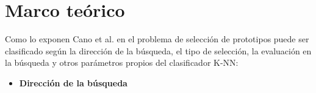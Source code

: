 \chapter{Marco teórico}
\label{capitulo1}

Como lo exponen Cano et al. en \cite{Cano2012} el problema de selección de prototipos puede ser clasificado según la dirección de la búsqueda, el tipo de selección, la evaluación en la búsqueda y otros parámetros propios del clasificador K-NN:

\begin{itemize}

\item\textbf{Dirección de la búsqueda}

\begin{itemize}

\end{itemize}

\end{itemize}
